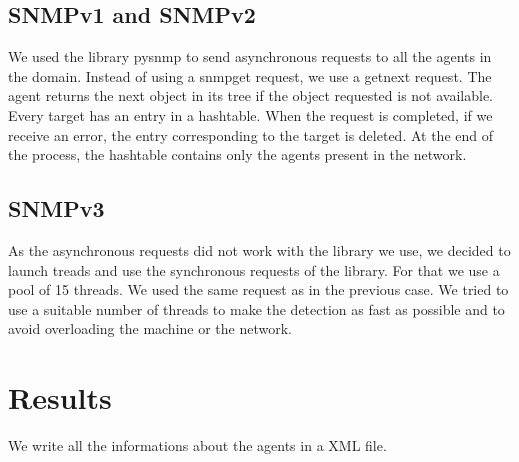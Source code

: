 \documentclass[a4paper,titlepage]{article}
\begin{document}
	\subsection{SNMPv1 and SNMPv2}
	We used the library pysnmp to send asynchronous requests to all the agents in the domain. Instead of using a snmpget request, we use a getnext 
	request. The agent returns the next object in its tree if the object requested is not available. Every target has an entry in a hashtable. When 	the request is completed, if we receive  an error, the entry corresponding to the target is deleted. At the end of the process, the hashtable 		contains only the agents present in the network. 




	\subsection{SNMPv3}
	As the asynchronous requests did not work with the library we use, we decided to launch treads and use the synchronous requests of the library. 
	For that we use a pool of 15 threads.  We used the same request as in the previous case. We tried to use a suitable number of threads to make  	    the detection as fast as possible and to avoid overloading the machine or the network.



\section{Results}
We write all the informations about the agents in a XML file.
\end{document}

